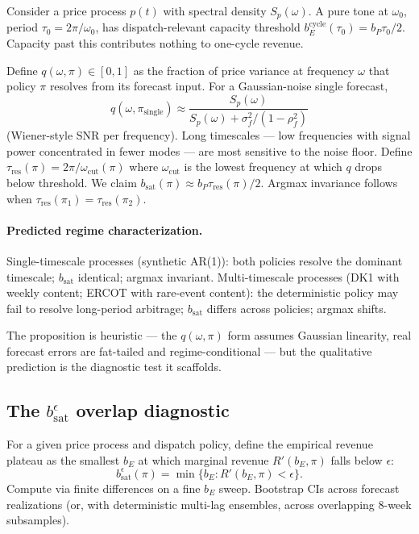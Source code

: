 \documentclass[11pt]{article}
\begin{document}
Consider a price process $p(t)$ with spectral density $S_p(\omega)$. A pure tone at $\omega_0$, period $\tau_0 = 2\pi/\omega_0$, has dispatch-relevant capacity threshold $b_E^{\mathrm{cycle}}(\tau_0) = b_P \tau_0 / 2$. Capacity past this contributes nothing to one-cycle revenue.

Define $q(\omega, \pi) \in [0, 1]$ as the fraction of price variance at frequency $\omega$ that policy $\pi$ resolves from its forecast input. For a Gaussian-noise single forecast,
\[
q(\omega, \pi_{\mathrm{single}}) \approx \frac{S_p(\omega)}{S_p(\omega) + \sigma_f^2 / (1 - \rho_f^2)}
\]
(Wiener-style SNR per frequency). Long timescales --- low frequencies with signal power concentrated in fewer modes --- are most sensitive to the noise floor. Define $\tau_{\mathrm{res}}(\pi) = 2\pi / \omega_{\mathrm{cut}}(\pi)$ where $\omega_{\mathrm{cut}}$ is the lowest frequency at which $q$ drops below threshold. We claim $b_{\mathrm{sat}}(\pi) \approx b_P \tau_{\mathrm{res}}(\pi) / 2$. Argmax invariance follows when $\tau_{\mathrm{res}}(\pi_1) = \tau_{\mathrm{res}}(\pi_2)$.

\paragraph{Predicted regime characterization.} Single-timescale processes (synthetic AR(1)): both policies resolve the dominant timescale; $b_{\mathrm{sat}}$ identical; argmax invariant. Multi-timescale processes (DK1 with weekly content; ERCOT with rare-event content): the deterministic policy may fail to resolve long-period arbitrage; $b_{\mathrm{sat}}$ differs across policies; argmax shifts.

The proposition is heuristic --- the $q(\omega, \pi)$ form assumes Gaussian linearity, real forecast errors are fat-tailed and regime-conditional --- but the qualitative prediction is the diagnostic test it scaffolds.

\subsection{The $b_{\mathrm{sat}}^\epsilon$ overlap diagnostic}\label{sec:diagnostic}

For a given price process and dispatch policy, define the empirical revenue plateau as the smallest $b_E$ at which marginal revenue $R'(b_E, \pi)$ falls below $\epsilon$:
\[
b_{\mathrm{sat}}^\epsilon(\pi) = \min \{ b_E : R'(b_E, \pi) < \epsilon \}.
\]
Compute via finite differences on a fine $b_E$ sweep. Bootstrap CIs across forecast realizations (or, with deterministic multi-lag ensembles, across overlapping 8-week subsamples).
\end{document}
